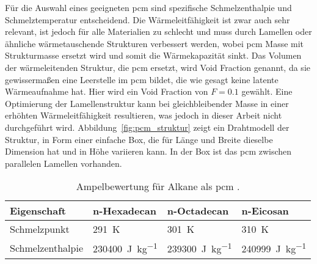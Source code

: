 Für die Auswahl eines geeigneten \ac{pcm} sind spezifische Schmelzenthalpie und Schmelztemperatur entscheidend.
Die Wärmeleitfähigkeit ist zwar auch sehr relevant, ist jedoch für alle Materialien zu schlecht und muss durch Lamellen oder ähnliche wärmetauschende Strukturen verbessert werden,
wobei \ac{pcm} Masse mit Strukturmasse ersetzt wird und somit die Wärmekapazität sinkt. Das Volumen der wärmeleitenden Struktur, die
\ac{pcm} ersetzt, wird Void Fraction genannt, da sie gewissermaßen eine Leerstelle im \ac{pcm} bildet, die wie gesagt keine latente Wärmeaufnahme hat. Hier
wird ein Void Fraction von $F = 0.1$ gewählt. Eine Optimierung der Lamellenstruktur kann bei gleichbleibender Masse in einer erhöhten
Wärmeleitfähigkeit resultieren, was jedoch in dieser Arbeit nicht durchgeführt wird. Abbildung~\ref{fig:pcm_struktur} zeigt ein Drahtmodell der Struktur,
in Form einer einfache Box, die für Länge und Breite dieselbe Dimension hat und in Höhe variieren kann. In der Box ist
das \ac{pcm} zwischen parallelen Lamellen vorhanden.

\begin{table}
  \centering
  \caption{Ampelbewertung für Alkane als \acs{pcm} \cite{NIST}.}\label{tab:pcm_auswahl}
  \label{tab:pcm_alkane_nist}
  \begin{tabular}{>{\raggedright\arraybackslash}m{3.1cm} m{3.1cm} m{3.1cm} m{3.1cm}}
    \toprule[1pt]
    Eigenschaft & n-Hexadecan & n-Octadecan & n-Eicosan \\
    \midrule[0.5pt]

    Schmelzpunkt
      & \cellcolor{bad}\SI{291}{\kelvin}
      & \cellcolor{medium}\SI{301}{\kelvin}
      & \cellcolor{good}\SI{310}{\kelvin} \\

    Schmelzenthalpie
      & \cellcolor{bad}\SI{230400}{\joule\per\kilo\gram}
      & \cellcolor{medium}\SI{239300}{\joule\per\kilo\gram}
      & \cellcolor{good}\SI{240999}{\joule\per\kilo\gram} \\
    \bottomrule[1pt]
  \end{tabular}
\end{table}

